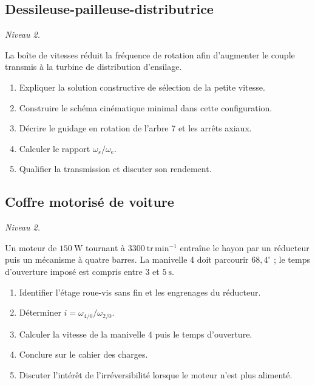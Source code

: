 \subsection{Dessileuse-pailleuse-distributrice}

\textit{Niveau 2.}

La boîte de vitesses réduit la fréquence de rotation afin d'augmenter le
couple transmis à la turbine de distribution d'ensilage.

\begin{center}
\hfill
{}
\end{center}

\begin{enumerate}
  \item Expliquer la solution constructive de sélection de la petite vitesse.
  \item Construire le schéma cinématique minimal dans cette configuration.
  \item Décrire le guidage en rotation de l'arbre 7 et les arrêts axiaux.
  \item Calculer le rapport $\omega_s/\omega_e$.
  \item Qualifier la transmission et discuter son rendement.
\end{enumerate}

\subsection{Coffre motorisé de voiture}

\textit{Niveau 2.}

Un moteur de $150\ \mathrm W$ tournant à $3300\ \mathrm{tr\,min^{-1}}$
entraîne le hayon par un réducteur puis un mécanisme à quatre barres. La
manivelle 4 doit parcourir $68{,}4^\circ$ ; le temps d'ouverture imposé
est compris entre $3$ et $5\ \mathrm s$.

\begin{center}
\hfill
{}\hfill
{}
\end{center}

\begin{enumerate}
  \item Identifier l'étage roue-vis sans fin et les engrenages du réducteur.
  \item Déterminer $i=\omega_{4/0}/\omega_{2/0}$.
  \item Calculer la vitesse de la manivelle 4 puis le temps d'ouverture.
  \item Conclure sur le cahier des charges.
  \item Discuter l'intérêt de l'irréversibilité lorsque le moteur n'est plus alimenté.
\end{enumerate}

